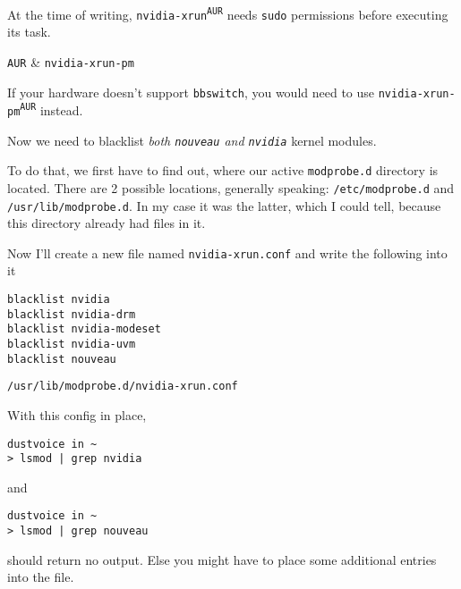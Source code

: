 \documentclass[10pt]{dustdoc}
\begin{document}
\begin{IMPORTANT}
    At the time of writing, \texttt{nvidia-xrun\textsuperscript{\texttt{AUR}}} needs \texttt{sudo} permissions before executing its task.
\end{IMPORTANT}

\begin{NOTE}
    \begin{pkgtable}
        \texttt{AUR} & \texttt{nvidia-xrun-pm} \\
    \end{pkgtable}

    If your hardware doesn’t support \texttt{bbswitch}, you would need to use \texttt{nvidia-xrun-pm\textsuperscript{\texttt{AUR}}} instead.
\end{NOTE}

Now we need to blacklist \emph{both \texttt{nouveau} and \texttt{nvidia}} kernel modules.

To do that, we first have to find out, where our active \texttt{modprobe.d} directory is located.
There are 2 possible locations, generally speaking: \texttt{/etc/modprobe.d} and \texttt{/usr/lib/modprobe.d}.
In my case it was the latter, which I could tell, because this directory already had files in it.

Now I’ll create a new file named \texttt{nvidia-xrun.conf} and write the following into it

\begin{mintedlisting}
    \begin{verbatim}
blacklist nvidia
blacklist nvidia-drm
blacklist nvidia-modeset
blacklist nvidia-uvm
blacklist nouveau
    \end{verbatim}

    \caption{\texttt{/usr/lib/modprobe.d/nvidia-xrun.conf}}
\end{mintedlisting}

With this config in place,

\begin{verbatim}
dustvoice in ~
> lsmod | grep nvidia
\end{verbatim}


\noindent
and

\begin{verbatim}
dustvoice in ~
> lsmod | grep nouveau
\end{verbatim}


\noindent
should return no output.
Else you might have to place some additional entries into the file.
\end{document}
